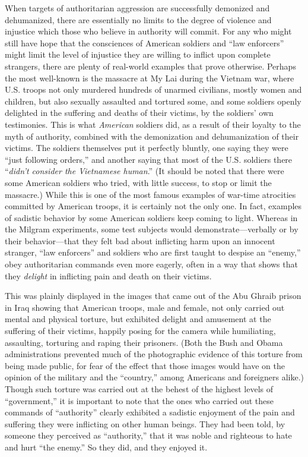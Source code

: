 \documentclass{book}
\begin{document}
When targets of authoritarian aggression are successfully demonized and dehumanized, there are essentially no limits to the degree of violence and injustice which those who believe in authority will commit. For any who might still have hope that the consciences of American soldiers and \enquote{law enforcers} might limit the level of injustice they are willing to inflict upon complete strangers, there are plenty of real-world examples that prove otherwise. Perhaps the most well-known is the massacre at My Lai during the Vietnam war, where U.S. troops not only murdered hundreds of unarmed civilians, mostly women and children, but also sexually assaulted and tortured some, and some soldiers openly delighted in the suffering and deaths of their victims, by the soldiers' own testimonies. This is what \emph{American} soldiers did, as a result of their loyalty to the myth of authority, combined with the demonization and dehumanization of their victims. The soldiers themselves put it perfectly bluntly, one saying they were \enquote{just following orders,} and another saying that most of the U.S. soldiers there \enquote{\emph{didn't consider the Vietnamese human}.} (It should be noted that there were some American soldiers who tried, with little success, to stop or limit the massacre.) While this is one of the most famous examples of war-time atrocities committed by American troops, it is certainly not the only one. In fact, examples of sadistic behavior by some American soldiers keep coming to light. Whereas in the Milgram experiments, some test subjects would demonstrate---verbally or by their behavior---that they felt bad about inflicting harm upon an innocent stranger, \enquote{law enforcers} and soldiers who are first taught to despise an \enquote{enemy,} obey authoritarian commands even more eagerly, often in a way that shows that they \emph{delight} in inflicting pain and death on their victims.

This was plainly displayed in the images that came out of the Abu Ghraib prison in Iraq showing that American troops, male and female, not only carried out mental and physical torture, but exhibited delight and amusement at the suffering of their victims, happily posing for the camera while humiliating, assaulting, torturing and raping their prisoners. (Both the Bush and Obama administrations prevented much of the photographic evidence of this torture from being made public, for fear of the effect that those images would have on the opinion of the military and the \enquote{country,} among Americans and foreigners alike.) Though such torture was carried out at the behest of the highest levels of \enquote{government,} it is important to note that the ones who carried out these commands of \enquote{authority} clearly exhibited a sadistic enjoyment of the pain and suffering they were inflicting on other human beings. They had been told, by someone they perceived as \enquote{authority,} that it was noble and righteous to hate and hurt \enquote{the enemy.} So they did, and they enjoyed it.
\end{document}
